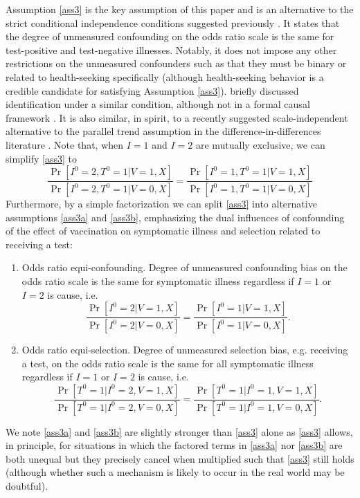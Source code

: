 \documentclass[11pt]{article}
\begin{document}
Assumption \ref{ass3} is the key assumption of this paper and is an alternative to the strict conditional independence conditions suggested previously \cite{schnitzer_estimands_2022}. It states that the degree of unmeasured confounding on the odds ratio scale is the same for test-positive and test-negative illnesses. Notably, it does not impose any other restrictions on the unmeasured confounders such as that they must be binary or related to health-seeking specifically (although health-seeking behavior is a credible candidate for satisfying Assumption \ref{ass3}). \citeauthor{lewnard_measurement_2018} briefly discussed identification under a similar condition, although not in a formal causal framework \cite{lewnard_measurement_2018}. It is also similar, in spirit, to a recently suggested scale-independent alternative to the parallel trend assumption in the difference-in-differences literature \cite{park_universal_2023,tchetgen_universal_2023}. Note that, when $I = 1$ and $I = 2$ are mutually exclusive, we can simplify \ref{ass3} to
\begin{equation}
    \frac{\Pr[I^0 = 2, T^0 = 1 | V = 1, X]}{\Pr[I^0 = 2, T^0 = 1 | V = 0, X]} =\frac{\Pr[I^0 = 1, T^0 = 1 | V = 1, X]}{\Pr[I^0 = 1, T^0 = 1 | V = 0, X]}
\end{equation}
Furthermore, by a simple factorization we can split \ref{ass3} into alternative assumptions \ref{ass3a} and \ref{ass3b}, emphasizing the dual influences of confounding of the effect of vaccination on symptomatic illness and selection related to receiving a test:
\begin{enumerate}[label=\upshape(A3\alph*), ref=A3\alph*]
    \item\label{ass3a}  Odds ratio equi-confounding. Degree of unmeasured confounding bias on the odds ratio scale is the same for symptomatic illness regardless if $I=1$ or $I=2$ is cause, i.e. 
    $$\frac{\Pr[I^0 = 2 | V = 1, X]}{\Pr[I^0 = 2 | V = 0, X]} =\frac{\Pr[I^0 = 1 | V = 1, X]}{\Pr[I^0 = 1 | V = 0, X]}.$$
    \item\label{ass3b} Odds ratio equi-selection. Degree of unmeasured selection bias, e.g. receiving a test, on the odds ratio scale is the same for all symptomatic illness regardless if $I=1$ or $I=2$ is cause, i.e. 
    $$\frac{\Pr[T^0 = 1 | I^0 = 2, V = 1, X]}{\Pr[T^0 = 1 | I^0 = 2, V = 0, X]} =\frac{\Pr[T^0 = 1 | I^0 = 1, V = 1, X]}{\Pr[T^0 = 1 | I^0 = 1, V = 0, X]}.$$
\end{enumerate}
We note \ref{ass3a} and \ref{ass3b} are slightly stronger than \ref{ass3} alone as \ref{ass3} allows, in principle, for situations in which the factored terms in \ref{ass3a} nor \ref{ass3b} are both unequal but they precisely cancel when multiplied such that \ref{ass3} still holds (although whether such a mechanism is likely to occur in the real world may be doubtful).
\end{document}
